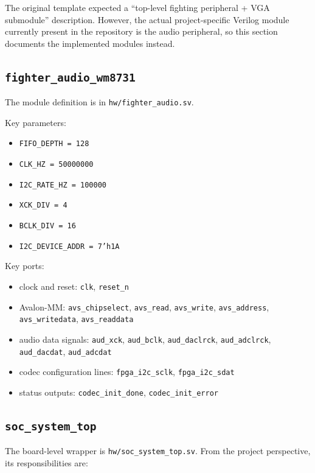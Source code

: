 \documentclass[12pt,a4paper]{article}
\begin{document}
The original template expected a ``top-level fighting peripheral + VGA submodule'' description. However, the actual project-specific Verilog module currently present in the repository is the audio peripheral, so this section documents the implemented modules instead.

\subsection{\texttt{fighter\_audio\_wm8731}}

The module definition is in \texttt{hw/fighter\_audio.sv}.

Key parameters:

\begin{itemize}
  \item \texttt{FIFO\_DEPTH = 128}
  \item \texttt{CLK\_HZ = 50000000}
  \item \texttt{I2C\_RATE\_HZ = 100000}
  \item \texttt{XCK\_DIV = 4}
  \item \texttt{BCLK\_DIV = 16}
  \item \texttt{I2C\_DEVICE\_ADDR = 7'h1A}
\end{itemize}

Key ports:

\begin{itemize}
  \item clock and reset: \texttt{clk}, \texttt{reset\_n}
  \item Avalon-MM: \texttt{avs\_chipselect}, \texttt{avs\_read}, \texttt{avs\_write}, \texttt{avs\_address}, \texttt{avs\_writedata}, \texttt{avs\_readdata}
  \item audio data signals: \texttt{aud\_xck}, \texttt{aud\_bclk}, \texttt{aud\_daclrck}, \texttt{aud\_adclrck}, \texttt{aud\_dacdat}, \texttt{aud\_adcdat}
  \item codec configuration lines: \texttt{fpga\_i2c\_sclk}, \texttt{fpga\_i2c\_sdat}
  \item status outputs: \texttt{codec\_init\_done}, \texttt{codec\_init\_error}
\end{itemize}

\subsection{\texttt{soc\_system\_top}}

The board-level wrapper is \texttt{hw/soc\_system\_top.sv}. From the project perspective, its responsibilities are:
\end{document}
